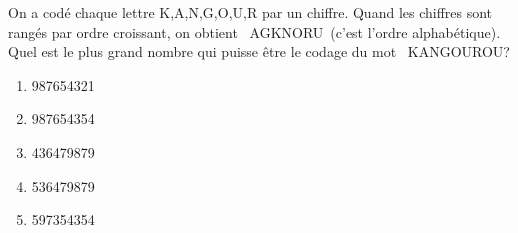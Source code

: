 On a codé chaque lettre K,A,N,G,O,U,R par un chiffre. Quand les chiffres sont rangés par ordre croissant, on obtient \og\ AGKNORU\fg\ (c'est l'ordre alphabétique). Quel est le plus grand nombre qui puisse être le codage du mot \og\ KANGOUROU\fg ?
\begin{multicols}{5}
  \begin{enumerate}[A/]
  \item 987654321
  \item 987654354
  \item 436479879
  \item 536479879
  \item 597354354
  \end{enumerate}
\end{multicols}